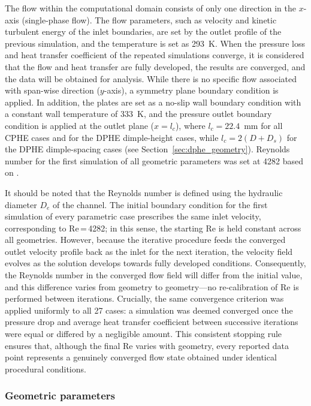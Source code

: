 \documentclass[review,12pt]{elsarticle}
\begin{document}
The flow within the computational domain consists of only one direction in the $x$-axis (single-phase flow). The flow parameters, such as velocity and kinetic turbulent energy of the inlet boundaries, are set by the outlet profile of the previous simulation, and the temperature is set as 293~K. When the pressure loss and heat transfer coefficient of the repeated simulations converge, it is considered that the flow and heat transfer are fully developed, the results are converged, and the data will be obtained for analysis. While there is no specific flow associated with span-wise direction ($y$-axis), a symmetry plane boundary condition is applied. In addition, the plates are set as a no-slip wall boundary condition with a constant wall temperature of 333~K, and the pressure outlet boundary condition is applied at the outlet plane ($x = l_c$), where $l_c = 22.4$~mm for all CPHE cases and for the DPHE dimple-height cases, while $l_c = 2(D + D_s)$ for the DPHE dimple-spacing cases (see Section~\ref{sec:dphe_geometry}). Reynolds number for the first simulation of all geometric parameters was set at 4282 based on \citet{jiang2019a}.

It should be noted that the Reynolds number is defined using the hydraulic diameter $D_e$ of the channel. The initial boundary condition for the first simulation of every parametric case prescribes the same inlet velocity, corresponding to Re\,=\,4282; in this sense, the starting Re is held constant across all geometries. However, because the iterative procedure feeds the converged outlet velocity profile back as the inlet for the next iteration, the velocity field evolves as the solution develops towards fully developed conditions. Consequently, the Reynolds number in the converged flow field will differ from the initial value, and this difference varies from geometry to geometry---no re-calibration of Re is performed between iterations. Crucially, the same convergence criterion was applied uniformly to all 27 cases: a simulation was deemed converged once the pressure drop and average heat transfer coefficient between successive iterations were equal or differed by a negligible amount. This consistent stopping rule ensures that, although the final Re varies with geometry, every reported data point represents a genuinely converged flow state obtained under identical procedural conditions.

\subsubsection{Geometric parameters}
\label{sec:geometric_parameters}
\end{document}
